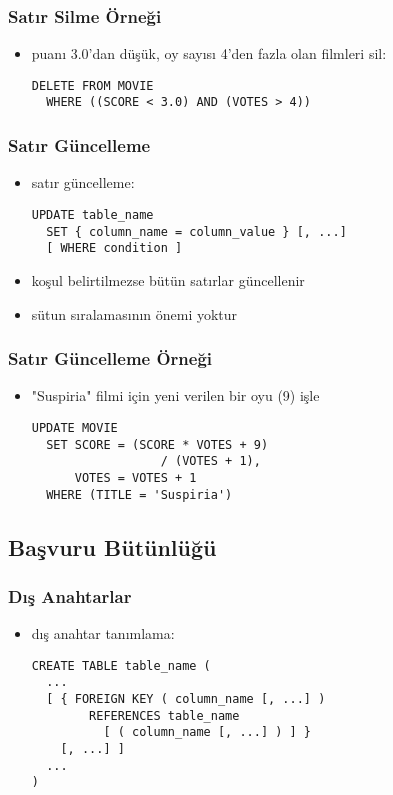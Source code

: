 \documentclass[dvipsnames]{beamer}
\theoremstyle{plain}
\begin{document}
\begin{frame}[fragile]
  \frametitle{Satır Silme Örneği}

  \begin{itemize}
    \item puanı 3.0'dan düşük, oy sayısı 4'den fazla olan filmleri sil:
    \begin{lstlisting}
DELETE FROM MOVIE
  WHERE ((SCORE < 3.0) AND (VOTES > 4))
    \end{lstlisting}
  \end{itemize}  
\end{frame}

\begin{frame}[fragile]
  \frametitle{Satır Güncelleme}

  \begin{itemize}
    \item satır güncelleme:
    \begin{lstlisting}
UPDATE table_name
  SET { column_name = column_value } [, ...]
  [ WHERE condition ]
    \end{lstlisting}

    \item koşul belirtilmezse bütün satırlar güncellenir
    \item sütun sıralamasının önemi yoktur
  \end{itemize}  
\end{frame}

\begin{frame}[fragile]
  \frametitle{Satır Güncelleme Örneği}

  \begin{itemize}
    \item "Suspiria" filmi için yeni verilen bir oyu (9) işle
    \begin{lstlisting}
UPDATE MOVIE
  SET SCORE = (SCORE * VOTES + 9)
                  / (VOTES + 1),
      VOTES = VOTES + 1
  WHERE (TITLE = 'Suspiria')
    \end{lstlisting}
  \end{itemize}  
\end{frame}

\subsection{Başvuru Bütünlüğü}

\begin{frame}[fragile]
  \frametitle{Dış Anahtarlar}

  \begin{itemize}
    \item dış anahtar tanımlama:
    \begin{lstlisting}
CREATE TABLE table_name (
  ...
  [ { FOREIGN KEY ( column_name [, ...] )
        REFERENCES table_name
          [ ( column_name [, ...] ) ] }
    [, ...] ]
  ...
)
    \end{lstlisting}
  \end{itemize}  
\end{frame}
\end{document}
